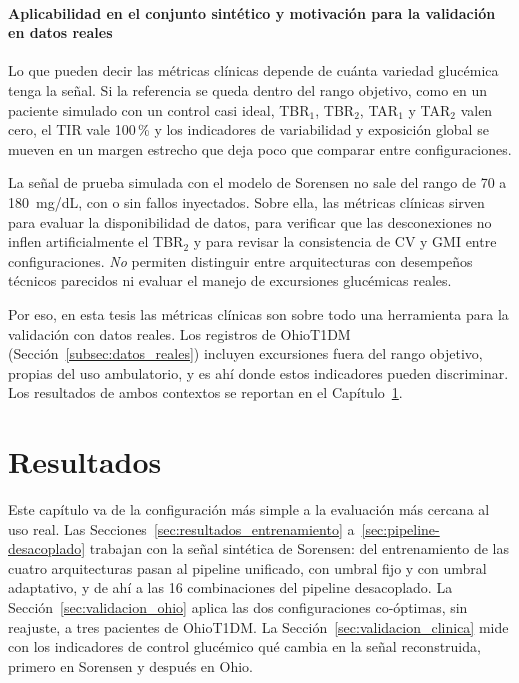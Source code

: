 \documentclass{report}
\begin{document}
\subsubsection{Aplicabilidad en el conjunto sintético y motivación para la validación en datos reales}
\label{subsec:cobertura_clinica}

Lo que pueden decir las métricas clínicas depende de cuánta variedad glucémica tenga la señal. Si la referencia se queda dentro del rango objetivo, como en un paciente simulado con un control casi ideal, TBR$_1$, TBR$_2$, TAR$_1$ y TAR$_2$ valen cero, el TIR vale 100\,\% y los indicadores de variabilidad y exposición global se mueven en un margen estrecho que deja poco que comparar entre configuraciones.

La señal de prueba simulada con el modelo de Sorensen no sale del rango de 70 a 180~mg/dL, con o sin fallos inyectados. Sobre ella, las métricas clínicas sirven para evaluar la disponibilidad de datos, para verificar que las desconexiones no inflen artificialmente el TBR$_2$ y para revisar la consistencia de CV y GMI entre configuraciones. \textit{No} permiten distinguir entre arquitecturas con desempeños técnicos parecidos ni evaluar el manejo de excursiones glucémicas reales.

Por eso, en esta tesis las métricas clínicas son sobre todo una herramienta para la validación con datos reales. Los registros de OhioT1DM (Sección~\ref{subsec:datos_reales}) incluyen excursiones fuera del rango objetivo, propias del uso ambulatorio, y es ahí donde estos indicadores pueden discriminar. Los resultados de ambos contextos se reportan en el Capítulo~\ref{cap:resultados}.

\chapter{Resultados}
\label{cap:resultados}

Este capítulo va de la configuración más simple a la evaluación más cercana al uso real. Las Secciones~\ref{sec:resultados_entrenamiento} a~\ref{sec:pipeline-desacoplado} trabajan con la señal sintética de Sorensen: del entrenamiento de las cuatro arquitecturas pasan al pipeline unificado, con umbral fijo y con umbral adaptativo, y de ahí a las 16 combinaciones del pipeline desacoplado. La Sección~\ref{sec:validacion_ohio} aplica las dos configuraciones co-óptimas, sin reajuste, a tres pacientes de OhioT1DM. La Sección~\ref{sec:validacion_clinica} mide con los indicadores de control glucémico qué cambia en la señal reconstruida, primero en Sorensen y después en Ohio.
\end{document}
